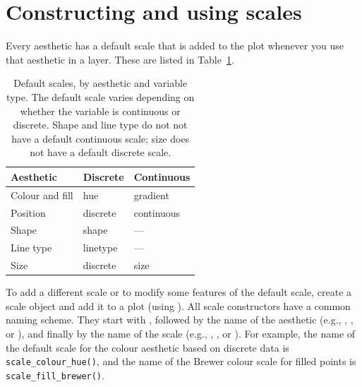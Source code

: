 \section{Constructing and using scales}
\label{sec:scale-usage}

Every aesthetic has a default scale that is added to the plot whenever you use that aesthetic in a layer.  These are listed in Table~\ref{tbl:default-scales}.

\begin{table}
  \begin{center}
  \begin{tabular}{lll}
    \toprule
    Aesthetic & Discrete & Continuous \\
    \midrule
    Colour and fill & hue & gradient \\
    Position & discrete & continuous \\
    Shape & shape & --- \\
    Line type & linetype & --- \\
    Size & discrete  & size \\
    \bottomrule
  \end{tabular}
  \end{center}
  \caption{Default scales, by aesthetic and variable type.  The default scale varies depending on whether the variable is continuous or discrete.  Shape and line type do not not have a default continuous scale; size does not have a default discrete scale.}
  \label{tbl:default-scales}
\end{table}

To add a different scale or to modify some features of the default scale, create a scale object and add it to a plot (using \code{+}). All scale constructors have a common naming scheme.  They start with , followed by the name of the aesthetic (e.g., , , or ), and finally by the name of the scale (e.g., , , or ). For example, the name of the default scale for the colour aesthetic based on discrete data is {\tt scale\_colour\_hue()}, and the name of the Brewer colour scale for filled points is {\tt scale\_fill\_brewer()}.

%



